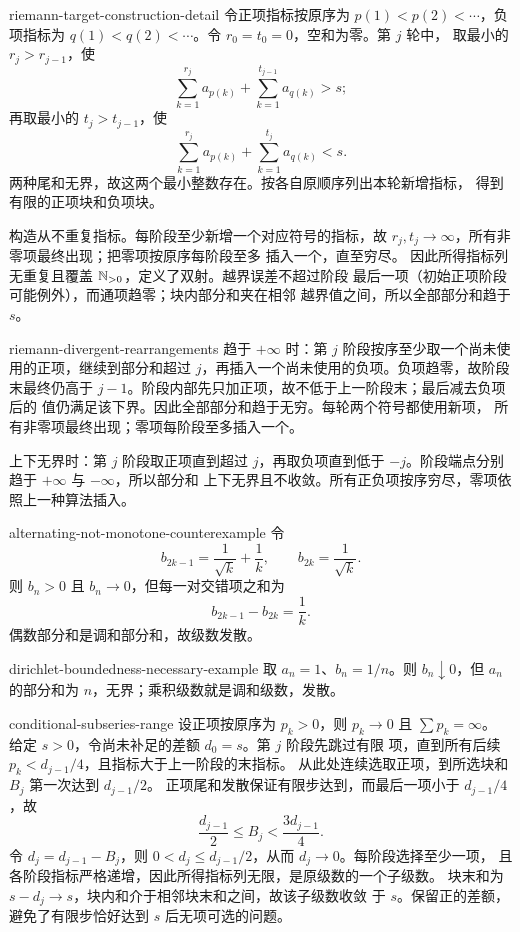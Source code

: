 \begin{solution}{riemann-target-construction-detail}
令正项指标按原序为 \(p(1)<p(2)<\cdots\)，负项指标为
\(q(1)<q(2)<\cdots\)。令 \(r_0=t_0=0\)，空和为零。第 \(j\) 轮中，
取最小的 \(r_j>r_{j-1}\)，使
\[
 \sum_{k=1}^{r_j}a_{p(k)}+\sum_{k=1}^{t_{j-1}}a_{q(k)}>s;
\]
再取最小的 \(t_j>t_{j-1}\)，使
\[
 \sum_{k=1}^{r_j}a_{p(k)}+\sum_{k=1}^{t_j}a_{q(k)}<s.
\]
两种尾和无界，故这两个最小整数存在。按各自原顺序列出本轮新增指标，
得到有限的正项块和负项块。

构造从不重复指标。每阶段至少新增一个对应符号的指标，故
\(r_j,t_j\to\infty\)，所有非零项最终出现；把零项按原序每阶段至多
插入一个，直至穷尽。
因此所得指标列无重复且覆盖 \(\mathbb{N}_{>0}\)，定义了双射。越界误差不超过阶段
最后一项（初始正项阶段可能例外），而通项趋零；块内部分和夹在相邻
越界值之间，所以全部部分和趋于 \(s\)。
\end{solution}

\begin{solution}{riemann-divergent-rearrangements}
趋于 \(+\infty\) 时：第 \(j\) 阶段按序至少取一个尚未使用的正项，继续到部分和超过
\(j\)，再插入一个尚未使用的负项。负项趋零，故阶段末最终仍高于
\(j-1\)。阶段内部先只加正项，故不低于上一阶段末；最后减去负项后的
值仍满足该下界。因此全部部分和趋于无穷。每轮两个符号都使用新项，
所有非零项最终出现；零项每阶段至多插入一个。

上下无界时：第 \(j\) 阶段取正项直到超过 \(j\)，再取负项直到低于
\(-j\)。阶段端点分别趋于 \(+\infty\) 与 \(-\infty\)，所以部分和
上下无界且不收敛。所有正负项按序穷尽，零项依照上一种算法插入。
\end{solution}

\begin{solution}{alternating-not-monotone-counterexample}
令
\[
 b_{2k-1}=\frac1{\sqrt k}+\frac1k,\qquad
 b_{2k}=\frac1{\sqrt k}.
\]
则 \(b_n>0\) 且 \(b_n\to0\)，但每一对交错项之和为
\[
 b_{2k-1}-b_{2k}=\frac1k.
\]
偶数部分和是调和部分和，故级数发散。
\end{solution}

\begin{solution}{dirichlet-boundedness-necessary-example}
取 \(a_n=1\)、\(b_n=1/n\)。则 \(b_n\downarrow0\)，但
\(a_n\) 的部分和为 \(n\)，无界；乘积级数就是调和级数，发散。
\end{solution}

\begin{solution}{conditional-subseries-range}
设正项按原序为 \(p_k>0\)，则 \(p_k\to0\) 且 \(\sum p_k=\infty\)。
给定 \(s>0\)，令尚未补足的差额 \(d_0=s\)。第 \(j\) 阶段先跳过有限
项，直到所有后续 \(p_k<d_{j-1}/4\)，且指标大于上一阶段的末指标。
从此处连续选取正项，到所选块和 \(B_j\) 第一次达到 \(d_{j-1}/2\)。
正项尾和发散保证有限步达到，而最后一项小于 \(d_{j-1}/4\)，故
\[
 \frac{d_{j-1}}2\le B_j<\frac{3d_{j-1}}4.
\]
令 \(d_j=d_{j-1}-B_j\)，则
\(0<d_j\le d_{j-1}/2\)，从而 \(d_j\to0\)。每阶段选择至少一项，
且各阶段指标严格递增，因此所得指标列无限，是原级数的一个子级数。
块末和为 \(s-d_j\to s\)，块内和介于相邻块末和之间，故该子级数收敛
于 \(s\)。保留正的差额，避免了有限步恰好达到 \(s\) 后无项可选的问题。
\end{solution}

